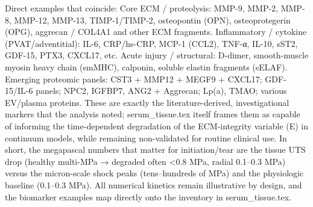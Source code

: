 Direct examples that coincide:
Core ECM / proteolysis: MMP-9, MMP-2, MMP-8, MMP-12, MMP-13, TIMP-1/TIMP-2, osteopontin (OPN), osteoprotegerin (OPG), aggrecan / COL4A1 and other ECM fragments.  
Inflammatory / cytokine (PVAT/adventitial): IL-6, CRP/hs-CRP, MCP-1 (CCL2), TNF-α, IL-10, sST2, GDF-15, PTX3, CXCL17, etc.  
Acute injury / structural: D-dimer, smooth-muscle myosin heavy chain (smMHC), calponin, soluble elastin fragments (sELAF).  
Emerging proteomic panels: CST3 + MMP12 + MEGF9 + CXCL17; GDF-15/IL-6 panels; NPC2, IGFBP7, ANG2 + Aggrecan; Lp(a), TMAO; various EV/plasma proteins.
These are exactly the literature-derived, investigational markers that the analysis noted; serum_tissue.tex itself frames them as capable of informing the time-dependent degradation of the ECM-integrity variable (E) in continuum models, while remaining non-validated for routine clinical use.
In short, the megapascal numbers that matter for initiation/tear are the tissue UTS drop (healthy multi-MPa → degraded often <0.8 MPa, radial 0.1–0.3 MPa) versus the micron-scale shock peaks (tens–hundreds of MPa) and the physiologic baseline (0.1–0.3 MPa). All numerical kinetics remain illustrative by design, and the biomarker examples map directly onto the inventory in serum_tissue.tex.
